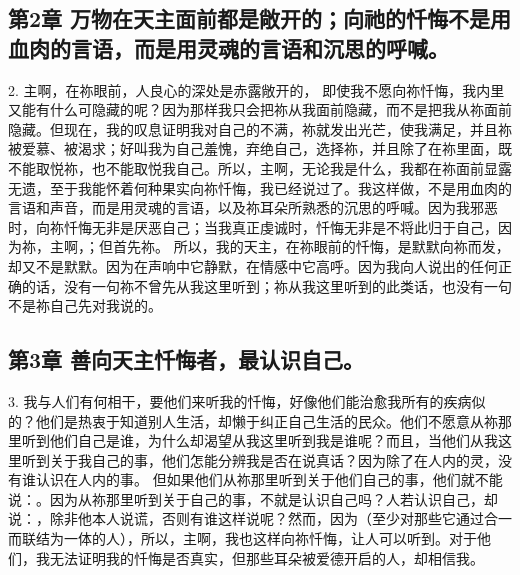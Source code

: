 
\subsection{第2章 万物在天主面前都是敞开的；向祂的忏悔不是用血肉的言语，而是用灵魂的言语和沉思的呼喊。}

2. 主啊，在祢眼前，人良心的深处是赤露敞开的， 即使我不愿向祢忏悔，我内里又能有什么可隐藏的呢？因为那样我只会把祢从我面前隐藏，而不是把我从祢面前隐藏。但现在，我的叹息证明我对自己的不满，祢就发出光芒，使我满足，并且祢被爱慕、被渴求；好叫我为自己羞愧，弃绝自己，选择祢，并且除了在祢里面，既不能取悦祢，也不能取悦我自己。所以，主啊，无论我是什么，我都在祢面前显露无遗，至于我能怀着何种果实向祢忏悔，我已经说过了。我这样做，不是用血肉的言语和声音，而是用灵魂的言语，以及祢耳朵所熟悉的沉思的呼喊。因为我邪恶时，向祢忏悔无非是厌恶自己；当我真正虔诚时，忏悔无非是不将此归于自己，因为祢，主啊，；但首先祢。 所以，我的天主，在祢眼前的忏悔，是默默向祢而发，却又不是默默。因为在声响中它静默，在情感中它高呼。因为我向人说出的任何正确的话，没有一句祢不曾先从我这里听到；祢从我这里听到的此类话，也没有一句不是祢自己先对我说的。\par


\subsection{第3章 善向天主忏悔者，最认识自己。}

3. 我与人们有何相干，要他们来听我的忏悔，好像他们能治愈我所有的疾病似的？他们是热衷于知道别人生活，却懒于纠正自己生活的民众。他们不愿意从祢那里听到他们自己是谁，为什么却渴望从我这里听到我是谁呢？而且，当他们从我这里听到关于我自己的事，他们怎能分辨我是否在说真话？因为除了在人内的灵，没有谁认识在人内的事。 但如果他们从祢那里听到关于他们自己的事，他们就不能说：。因为从祢那里听到关于自己的事，不就是认识自己吗？人若认识自己，却说：，除非他本人说谎，否则有谁这样说呢？然而，因为（至少对那些它通过合一而联结为一体的人），所以，主啊，我也这样向祢忏悔，让人可以听到。对于他们，我无法证明我的忏悔是否真实，但那些耳朵被爱德开启的人，却相信我。\par

